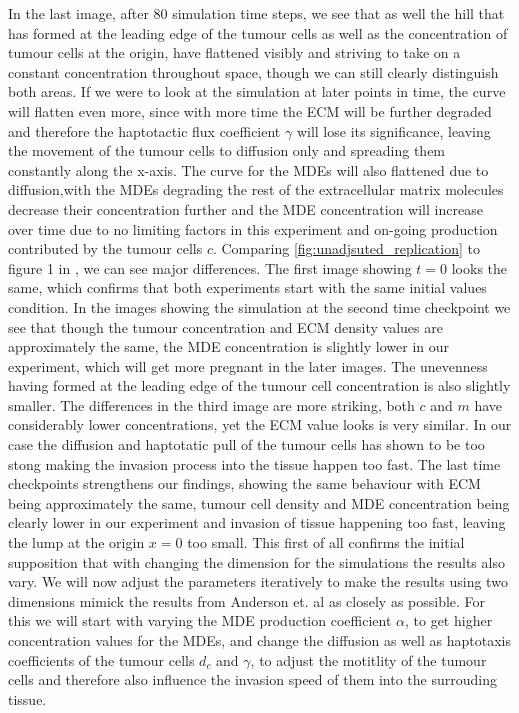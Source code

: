 In the last image, after 80 simulation time steps, we see that as well the hill that has formed at the leading edge of the tumour cells as well as the concentration of tumour cells at the origin, have flattened visibly and striving to take on a constant concentration throughout space, though we can still clearly distinguish both areas. If we were to look at the simulation at later points in time, the curve will flatten even more, since with more time the ECM will be further degraded and therefore the haptotactic flux coefficient $\gamma$ will lose its significance, leaving the movement of the tumour cells to diffusion only and spreading them constantly along the x-axis. The curve for the MDEs will also flattened due to diffusion,with the MDEs degrading the rest of the extracellular matrix molecules decrease their concentration further and the MDE concentration will increase over time due to no limiting factors in this experiment and on-going production contributed by the tumour cells $c$.\newline
Comparing \ref{fig:unadjsuted_replication} to figure 1 in \cite{anderson_mathematical_2000}, we can see major differences. The first image showing $t=0$ looks the same, which confirms that both experiments start with the same initial values condition. In the images showing the simulation at the second time checkpoint we see that though the tumour concentration and ECM density values are approximately the same, the MDE concentration is slightly lower in our experiment, which will get more pregnant in the later images. The unevenness having formed at the leading edge of the tumour cell concentration is also slightly smaller. The differences in the third image are more striking, both $c$ and $m$ have considerably lower concentrations, yet the ECM value looks is very similar. \newline 
In our case the diffusion and haptotatic pull of the tumour cells has shown to be too stong making the invasion process into the tissue happen too fast. The last time checkpoints strengthens our findings, showing the same behaviour with ECM being approximately the same, tumour cell density and MDE concentration being clearly lower in our experiment and invasion of tissue happening too fast, leaving the lump at the origin $x=0$ too small. \newline 
This first of all confirms the initial supposition that with changing the dimension for the simulations the results also vary. We will now adjust the parameters iteratively to make the results using two dimensions mimick the results from Anderson et. al as closely as possible. For this we will start with varying the MDE production coefficient $\alpha$, to get higher concentration values for the MDEs, and change the diffusion as well as haptotaxis coefficients of the tumour cells $d_c$ and  $\gamma$, to adjust the motitlity of the tumour cells and therefore also influence the invasion speed of them into the surrouding tissue.

